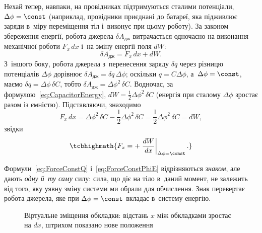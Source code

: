 Нехай тепер, навпаки, на провідниках підтримуються сталими потенціали, $\Delta\phi =
\const$ (наприклад, провідники приєднані до батареї, яка підживлює заряди в~міру
переміщення тіл і~виконує при цьому роботу). За законом збереження енергії, робота джерела
$\delta A_\text{дж}$ витрачається одночасно на виконання механічної роботи $F_x\, dx$ і~на
зміну енергії поля $dW$:
\begin{equation*}
	\delta A_\text{дж} = F_x\, dx + dW.
\end{equation*}
З~іншого боку, робота джерела з~перенесення заряду $\delta q$ через різницю потенціалів
$\Delta\phi$ дорівнює $\delta A_\text{дж} = \delta q\, \Delta\phi$; оскільки $q =
C\Delta\phi$, а~$\Delta\phi = \const$, маємо $\delta q = \Delta\phi\, \delta C$, тобто
$\delta A_\text{дж} = \Delta\phi^2\, \delta C$. Водночас, за
формулою~\eqref{eq:CapacitorEnergy}, $dW = \tfrac12\Delta\phi^2\, \delta C$ (енергія при
сталому $\Delta\phi$ зростає разом із ємністю). Підставляючи, знаходимо
\begin{equation*}
	F_x\, dx = \Delta\phi^2\,\delta C - \frac12\Delta\phi^2\,\delta C = \frac12\Delta\phi^2\,\delta C = dW,
\end{equation*}
звідки
\begin{equation}\label{eq:ForceConstPhiE}
	\tcbhighmath{
		F_x = +\left.\frac{dW}{dx}\right|_{\Delta\phi=\const}.
	}
\end{equation}

\begin{Attention}[unbreakable]
	Формули~\eqref{eq:ForceConstQ} і~\eqref{eq:ForceConstPhiE} відрізняються \emph{знаком},
	але дають \emph{одну й~ту саму} силу: сила, що діє на тіло в~даний момент, не залежить
	від того, яку уявну зміну системи ми обрали для обчислення. Знак перевертає робота
	джерела, яке при $\Delta\phi=\const$ вкладає в~систему енергію.
\end{Attention}

\begin{figure}\centering
	\caption{Віртуальне зміщення обкладки: відстань $x$ між обкладками зростає на $dx$, штрихом показано нове положення\label{pic:VirtualDisplacement}}
\end{figure}

